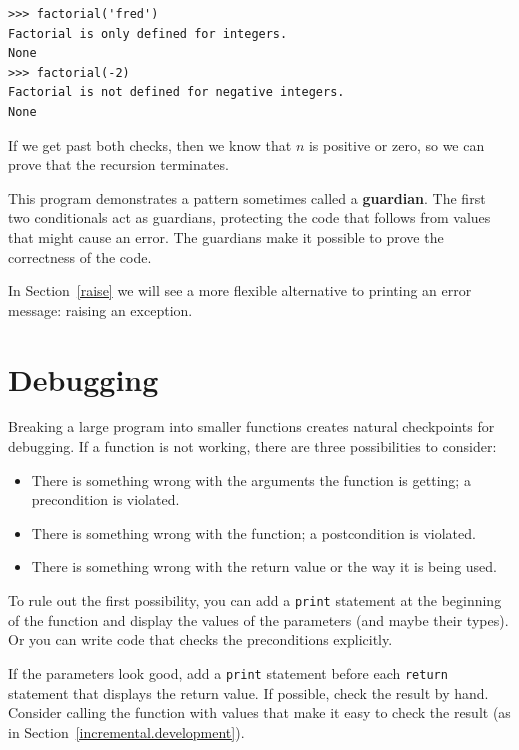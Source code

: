 \documentclass[10pt]{book}
\begin{document}
\begin{CJK}{UTF8}{gbsn}
\begin{verbatim}
>>> factorial('fred')
Factorial is only defined for integers.
None
>>> factorial(-2)
Factorial is not defined for negative integers.
None
\end{verbatim}
% 
If we get past both checks, then we know that $n$ is positive or
zero, so we can prove that the recursion terminates.

This program demonstrates a pattern sometimes called a {\bf guardian}.
The first two conditionals act as guardians, protecting the code that
follows from values that might cause an error.  The guardians make it
possible to prove the correctness of the code.

In Section~\ref{raise} we will see a more flexible alternative to printing
an error message: raising an exception.


\section{Debugging}
\label{factdebug}

Breaking a large program into smaller functions creates natural
checkpoints for debugging.  
If a function is not working, there are
three possibilities to consider:

\begin{itemize}

\item There is something wrong with the arguments the function
is getting; a precondition is violated.

\item There is something wrong with the function; a postcondition
is violated.

\item There is something wrong with the return value or the
way it is being used.

\end{itemize}

To rule out the first possibility, you can add a {\tt print} statement
at the beginning of the function and display the values of the
parameters (and maybe their types).  Or you can write code
that checks the preconditions explicitly.

If the parameters look good, add a {\tt print} statement before each
{\tt return} statement that displays the return value.  If
possible, check the result by hand.  Consider calling the
function with values that make it easy to check the result
(as in Section~\ref{incremental.development}).


\end{CJK}
\end{document}

